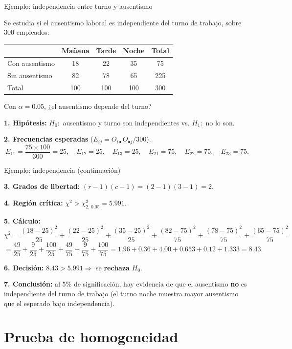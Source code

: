 \documentclass[aspectratio=169,11pt]{beamer}
\begin{document}
\begin{frame}{Ejemplo: independencia entre turno y ausentismo}
\begin{example}
Se estudia si el ausentismo laboral es independiente del turno de trabajo, sobre $300$ empleados:
\begin{center}
\begin{tabular}{@{}lccc|c@{}}
\toprule
 & Mañana & Tarde & Noche & Total \\
\midrule
Con ausentismo & 18 & 22 & 35 & 75 \\
Sin ausentismo & 82 & 78 & 65 & 225 \\
\midrule
Total & 100 & 100 & 100 & 300 \\
\bottomrule
\end{tabular}
\end{center}
Con $\alpha=0.05$, ¿el ausentismo depende del turno?

\textbf{1. Hipótesis:} $H_0:$ ausentismo y turno son independientes vs. $H_1:$ no lo son.

\textbf{2. Frecuencias esperadas} ($E_{ij}=O_{i\bullet}O_{\bullet j}/300$):
\[
E_{11}=\frac{75\times100}{300}=25, \quad E_{12}=25, \quad E_{13}=25, \quad E_{21}=75, \quad E_{22}=75, \quad E_{23}=75.
\]
\end{example}
\end{frame}

\begin{frame}{Ejemplo: independencia (continuación)}
\begin{example}
\textbf{3. Grados de libertad:} $(r-1)(c-1)=(2-1)(3-1)=2$.

\textbf{4. Región crítica:} $\chi^2>\chi^2_{2,\,0.05}=5.991$.

\textbf{5. Cálculo:}
\[
\chi^2=\frac{(18-25)^2}{25}+\frac{(22-25)^2}{25}+\frac{(35-25)^2}{25}+\frac{(82-75)^2}{75}+\frac{(78-75)^2}{75}+\frac{(65-75)^2}{75}
\]
\[
=\frac{49}{25}+\frac{9}{25}+\frac{100}{25}+\frac{49}{75}+\frac{9}{75}+\frac{100}{75} = 1.96+0.36+4.00+0.653+0.12+1.333 = 8.43.
\]

\textbf{6. Decisión:} $8.43>5.991\Rightarrow$ se \textbf{rechaza} $H_0$.

\textbf{7. Conclusión:} al $5\%$ de significación, hay evidencia de que el ausentismo \textbf{no} es independiente del turno de trabajo (el turno noche muestra mayor ausentismo que el esperado bajo independencia).
\end{example}
\end{frame}

\section{Prueba de homogeneidad}
\end{document}
